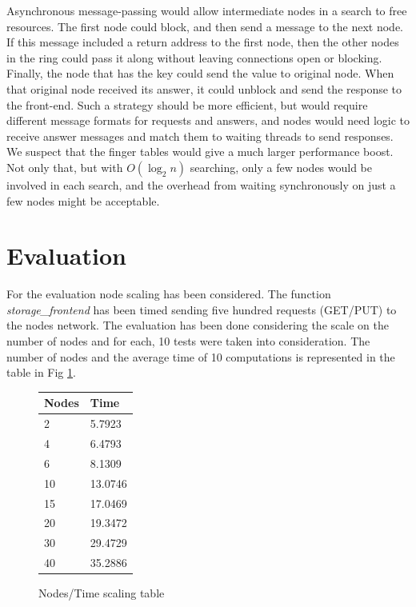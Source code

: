 \documentclass[11pt,conference]{IEEEtran}
\begin{document}
Asynchronous message-passing would allow intermediate nodes in a search to free
resources. The first node could block, and then send a message to the next node.
If this message included a return address to the first node, then the other
nodes in the ring could pass it along without leaving connections open or
blocking. Finally, the node that has the key could send the value to original
node. When that original node received its answer, it could unblock and send the
response to the front-end. Such a strategy should be more efficient, but would
require different message formats for requests and answers, and nodes would need
logic to receive answer messages and match them to waiting threads to send
responses. We suspect that the finger tables would give a much larger
performance boost. Not only that, but with $O(\log_2 n)$ searching, only a few
nodes would be involved in each search, and the overhead from waiting
synchronously on just a few nodes might be acceptable.


\section{Evaluation}
For the evaluation node scaling has been considered. The function \textit{storage\_frontend} has been timed sending five hundred requests (GET/PUT) to the nodes network. The evaluation has been done considering the scale on the number of nodes and for each, 10 tests were taken into consideration.
\newline
The number of nodes and the average time of 10 computations is represented in the table in Fig \ref{tab:scaling}.

\begin{figure}[h!]
\centering
\caption{Nodes/Time scaling table}
\begin{tabular}[H]{ | l | l | }
\hline
	Nodes & Time \\ \hline
	2 & 5.7923 \\ \hline
	4 & 6.4793 \\ \hline
	6 & 8.1309 \\ \hline
	10 & 13.0746 \\ \hline
	15 & 17.0469 \\ \hline
	20 & 19.3472 \\ \hline
	30 & 29.4729 \\ \hline
	40 & 35.2886 \\ \hline
\end{tabular}
\label{tab:scaling}
\end{figure}
\end{document}
